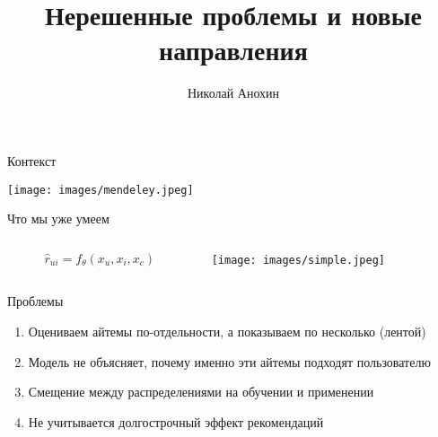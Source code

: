 \documentclass[11pt,aspectratio=169,handout]{beamer}
\author{Николай Анохин}
\title{Нерешенные проблемы и новые направления}
\begin{document}
{

\begin{frame}
\titlepage
\end{frame}


}

\begin{frame}{Контекст}

\begin{center}
\texttt{[image: images/mendeley.jpeg]}
\end{center}

\end{frame}

\begin{frame}{Что мы уже умеем}

\begin{columns}
\begin{column}{0.55\textwidth}
\begin{center}
\begin{tcolorbox}[colback=info!5,colframe=info!80,title=]
\begin{large}
\[
\hat r_{ui} = f_{\theta}(x_u, x_i, x_c)
\]
\end{large}
\end{tcolorbox}\end{center}
\end{column}

\begin{column}{0.35\textwidth} 
\begin{center}
\texttt{[image: images/simple.jpeg]}
\end{center}
\end{column}
\end{columns}

\vfill

Проблемы
\begin{enumerate}[<+->]
\item Оцениваем айтемы по-отдельности, а показываем по несколько (лентой)
\item Модель не объясняет, почему именно эти айтемы подходят пользователю
\item Смещение между распределениями на обучении и применении
\item {\color{blue} Не учитывается долгострочный эффект рекомендаций}
\end{enumerate}

\end{frame}
\end{document}
